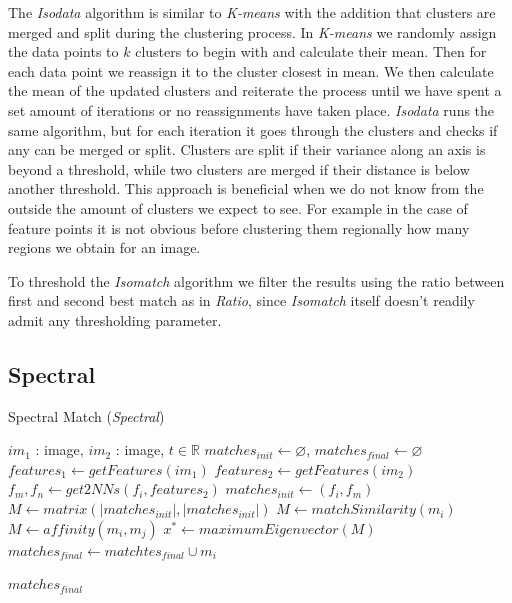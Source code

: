 The \emph{Isodata} algorithm is similar to \emph{K-means} with the 
addition that clusters are merged and split during the clustering 
process. In \emph{K-means} we randomly assign the data points to $k$ 
clusters to begin with and calculate their mean. Then for each data 
point we reassign it to the cluster closest in mean. We then calculate 
the mean of the updated clusters and reiterate the process until we have 
spent a set amount of iterations or no reassignments have taken place.  
\emph{Isodata} runs the same algorithm, but for each iteration it goes 
through the clusters and checks if any can be merged or split.  Clusters 
are split if their variance along an axis is beyond a threshold, while 
two clusters are merged if their distance is below another threshold.  
This approach is beneficial when we do not know from the outside the 
amount of clusters we expect to see. For example in the case of feature 
points it is not obvious before clustering them regionally how many 
regions we obtain for an image.

To threshold the \emph{Isomatch} algorithm we filter the results using 
the ratio between first and second best match as in \emph{Ratio}, since 
\emph{Isomatch} itself doesn't readily admit any thresholding parameter.  

\subsection{Spectral}

\begin{algorithm}[h]
\caption{Spectral Match (\emph{Spectral})}
\label{alg-spectral}
{\fontsize{11}{11}\selectfont
\begin{algorithmic}
\Require $im_1$ : image, $im_2$ : image, $t \in \mathbb{R}$
\State $matches_{init}\gets \varnothing$, $matches_{final} \gets 
\varnothing$
\State $features_1 \gets getFeatures(im_1)$
\State $features_2 \gets getFeatures(im_2)$
	\State $f_m,f_n \gets get2NNs(f_i, features_2)$
	\State $matches_{init} \gets \left(f_i, f_m\right)$
\EndFor
\State $M \gets matrix(\left\vert matches_{init} \right\vert, \left\vert 
matches_{init} \right\vert)$
			\State $M \gets matchSimilarity(m_i)$
		\Else
			\State $M \gets affinity(m_i, m_j)$
		\EndIf
	\EndFor
\EndFor
\State $x^{*} \gets maximumEigenvector(M)$
		\State $matches_{final} \gets matchtes_{final} \cup m_i$
	\EndIf
\EndFor

\Return $matches_{final}$
\end{algorithmic}
}
\end{algorithm}

